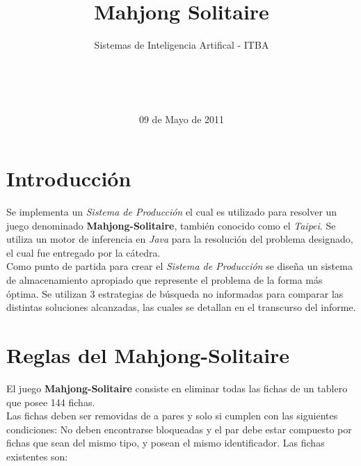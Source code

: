 \documentclass{sig-alternate}
\begin{document}

\title{Mahjong Solitaire}
\subtitle{Sistemas de Inteligencia Artifical - ITBA}


\author{
	\\
	\\
	\\
}

\date{09 de Mayo de 2011}

\maketitle

\section*{Introducci\'on}
	Se implementa un \textit{Sistema de Producci\'on} el cual es utilizado para resolver un juego denominado \textbf{Mahjong-Solitaire}, tambi\'en conocido como el \textit{Taipei}. Se utiliza un motor de inferencia en \textit{Java} para la resoluci\'on del problema designado, el cual fue entregado por la c\'atedra. \\
	Como punto de partida para crear el \textit{Sistema de Producci\'on} se dise\~{n}a un sistema de almacenamiento apropiado que represente el problema de la forma m\'as \'optima. Se utilizan 3 estrategias de b\'usqueda no informadas para comparar las distintas soluciones alcanzadas, las cuales se detallan en el transcurso del informe.

\section*{Reglas del Mahjong-Solitaire}
	El juego \textbf{Mahjong-Solitaire} consiste en eliminar todas las fichas de un tablero que posee 144 fichas. \\
	Las fichas deben ser removidas de a pares y solo si cumplen con las siguientes condiciones: No deben encontrarse bloqueadas y el par debe estar compuesto por fichas que sean del mismo tipo, y posean el mismo identificador. Las fichas existentes son:
\end{document}
